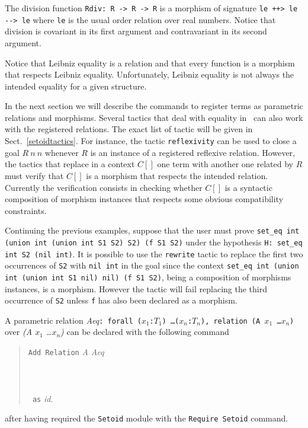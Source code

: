 \begin{cscexample}
The division function \texttt{Rdiv: R -> R -> R} is a morphism of
signature \texttt{le ++> le -{}-> le} where \texttt{le} is
the usual order relation over real numbers. Notice that division is
covariant in its first argument and contravariant in its second
argument.
\end{cscexample}

Notice that Leibniz equality is a relation and that every function is a
morphism that respects Leibniz equality. Unfortunately, Leibniz equality
is not always the intended equality for a given structure.

In the next section we will describe the commands to register terms as
parametric relations and morphisms. Several tactics that deal with equality
in \Coq\ can also work with the registered relations.
The exact list of tactic will be given in Sect.~\ref{setoidtactics}.
For instance, the
tactic \texttt{reflexivity} can be used to close a goal $R~n~n$ whenever
$R$ is an instance of a registered reflexive relation. However, the tactics
that replace in a context $C[]$ one term with another one related by $R$
must verify that $C[]$ is a morphism that respects the intended relation.
Currently the verification consists in checking whether $C[]$ is a syntactic
composition of morphism instances that respects some obvious
compatibility constraints.

\begin{cscexample}[Rewriting]
Continuing the previous examples, suppose that the user must prove
\texttt{set\_eq int (union int (union int S1 S2) S2) (f S1 S2)} under the
hypothesis \texttt{H: set\_eq int S2 (nil int)}. It is possible to
use the \texttt{rewrite} tactic to replace the first two occurrences of
\texttt{S2} with \texttt{nil int} in the goal since the context
\texttt{set\_eq int (union int (union int S1 nil) nil) (f S1 S2)}, being
a composition of morphisms instances, is a morphism. However the tactic
will fail replacing the third occurrence of \texttt{S2} unless \texttt{f}
has also been declared as a morphism.
\end{cscexample}

A parametric relation
\textit{Aeq}\texttt{: forall ($x_1$:$T_1$) \ldots ($x_n$:$T_n$),
 relation (A $x_1$ \ldots $x_n$)} over \textit{(A $x_1$ \ldots $x_n$)}
can be declared with the following command

\begin{quote}
  \texttt{Add Relation} \textit{A Aeq}\\
  ~\\
  ~\\
  ~\\
  \texttt{~as} \textit{id}.
\end{quote}
after having required the \texttt{Setoid} module with the
\texttt{Require Setoid} command.

